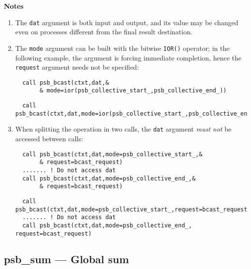 {\par\noindent\large\bfseries Notes}
\begin{enumerate}
\item The \verb|dat| argument is both input and output, and its
  value may be changed even on processes different from the final
  result destination.
\item The \verb|mode| argument can be built with the bitwise
  \verb|IOR()| operator; in the following example, the   argument is
  forcing immediate completion, hence the \verb|request| argument
  needs not be specified: 
\ifpdf
\begin{verbatim}
  call psb_bcast(ctxt,dat,&
       & mode=ior(psb_collective_start_,psb_collective_end_))
\end{verbatim}
\else
\begin{center}
    \begin{minipage}[tl]{0.9\textwidth}
\begin{verbatim} 
  call psb_bcast(ctxt,dat,mode=ior(psb_collective_start_,psb_collective_end_))
\end{verbatim}
    \end{minipage}
  \end{center}
\fi
  
\item When splitting the operation in two calls, the \verb|dat|
  argument  \emph{must not} be accessed between calls:
\ifpdf
\begin{verbatim}
  call psb_bcast(ctxt,dat,mode=psb_collective_start_,&
       & request=bcast_request)
  ....... ! Do not access dat 
  call psb_bcast(ctxt,dat,mode=psb_collective_end_,&
       & request=bcast_request)
\end{verbatim}
\else
\begin{center}
    \begin{minipage}[tl]{0.9\textwidth}
\begin{verbatim} 
  call psb_bcast(ctxt,dat,mode=psb_collective_start_,request=bcast_request)
  ....... ! Do not access dat 
  call psb_bcast(ctxt,dat,mode=psb_collective_end_, request=bcast_request)
\end{verbatim}
    \end{minipage}
  \end{center}
\fi
\end{enumerate}




\clearpage\subsection{psb\_sum --- Global sum}

